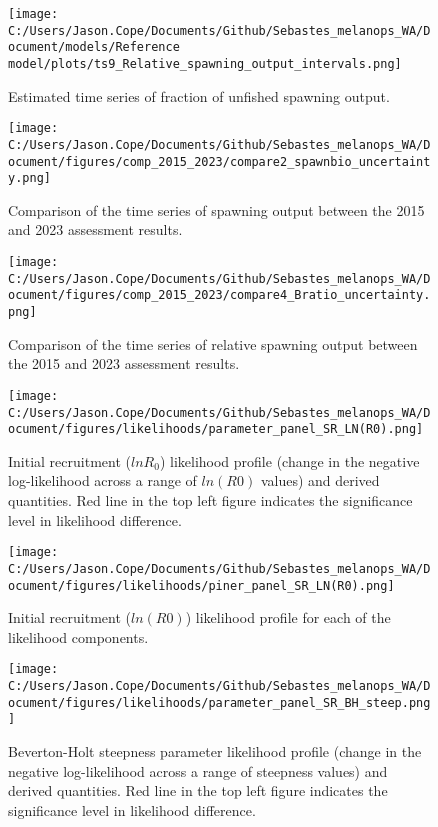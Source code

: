 \documentclass[11pt,
  english,
  letterpaper,
]{article}
\begin{document}
\begin{figure}
\centering
\texttt{[image: C:/Users/Jason.Cope/Documents/Github/Sebastes\_melanops\_WA/Document/models/Reference model/plots/ts9\_Relative\_spawning\_output\_intervals.png]}
\caption{Estimated time series of fraction of unfished spawning output.\label{fig:depl}}
\end{figure}

\begin{figure}
\centering
\texttt{[image: C:/Users/Jason.Cope/Documents/Github/Sebastes\_melanops\_WA/Document/figures/comp\_2015\_2023/compare2\_spawnbio\_uncertainty.png]}
\caption{Comparison of the time series of spawning output between the 2015 and 2023 assessment results.\label{fig:comp_ssb}}
\end{figure}

\begin{figure}
\centering
\texttt{[image: C:/Users/Jason.Cope/Documents/Github/Sebastes\_melanops\_WA/Document/figures/comp\_2015\_2023/compare4\_Bratio\_uncertainty.png]}
\caption{Comparison of the time series of relative spawning output between the 2015 and 2023 assessment results.\label{fig:comp_depl}}
\end{figure}

\begin{figure}
\centering
\texttt{[image: C:/Users/Jason.Cope/Documents/Github/Sebastes\_melanops\_WA/Document/figures/likelihoods/parameter\_panel\_SR\_LN(R0).png]}
\caption{Initial recruitment (\(lnR_0\)) likelihood profile (change in the negative log-likelihood across a range of \(ln(R0)\) values) and derived quantities. Red line in the top left figure indicates the significance level in likelihood difference.\label{fig:R0-profile}}
\end{figure}

\begin{figure}
\centering
\texttt{[image: C:/Users/Jason.Cope/Documents/Github/Sebastes\_melanops\_WA/Document/figures/likelihoods/piner\_panel\_SR\_LN(R0).png]}
\caption{Initial recruitment (\(ln(R0)\)) likelihood profile for each of the likelihood components.\label{fig:R0-profile-components}}
\end{figure}

\begin{figure}
\centering
\texttt{[image: C:/Users/Jason.Cope/Documents/Github/Sebastes\_melanops\_WA/Document/figures/likelihoods/parameter\_panel\_SR\_BH\_steep.png]}
\caption{Beverton-Holt steepness parameter likelihood profile (change in the negative log-likelihood across a range of steepness values) and derived quantities. Red line in the top left figure indicates the significance level in likelihood difference.\label{fig:steepness-profile}}
\end{figure}
\end{document}
